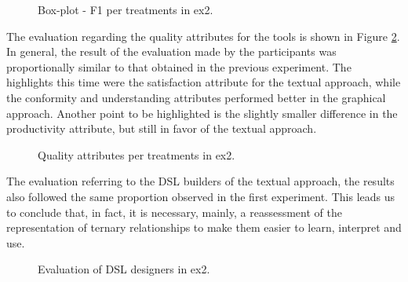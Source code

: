 \begin{figure}[!htb]
        \centering
        \caption{Box-plot - F1 per treatments in \ac{ex2}.}
        \label{fig:boxplotMedidaF2}
        
\end{figure}

The evaluation regarding the quality attributes for the tools is shown in Figure \ref{fig:inst3GERALExp2}.
In general, the result of the evaluation made by the participants was proportionally similar to that obtained in the previous experiment.
The highlights this time were the satisfaction attribute for the textual approach, while the conformity and understanding attributes performed better in the graphical approach.
Another point to be highlighted is the slightly smaller difference in the productivity attribute, but still in favor of the textual approach.

\begin{figure}[!htb]
    \centering
    \caption{Quality attributes per treatments in \ac{ex2}.}
    \label{fig:inst3GERALExp2}
    
\end{figure}

The evaluation referring to the DSL builders of the textual approach, the results also followed the same proportion observed in the first experiment.
This leads us to conclude that, in fact, it is necessary, mainly, a reassessment of the representation of ternary relationships to make them easier to learn, interpret and use.

\begin{figure}[!htb]
    \centering
    \caption{Evaluation of DSL designers in \ac{ex2}.}
    \label{fig:inst4GERALExp2}
    
\end{figure}


